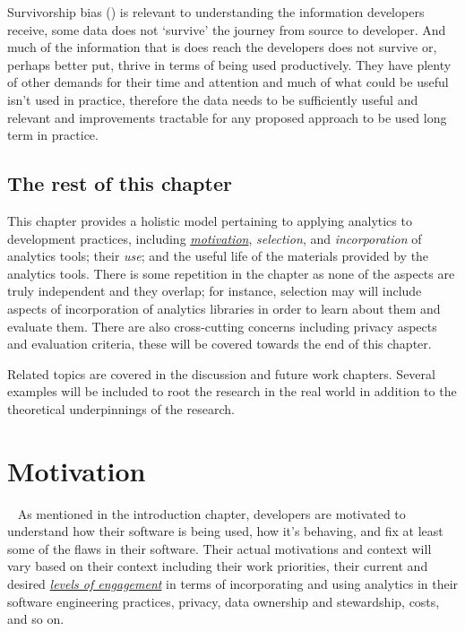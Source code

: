 Survivorship bias (\cite{wikipedia_survivorship_bias}) is relevant to understanding the information developers receive, some data does not `survive' the journey from source to developer. And much of the information that is does reach the developers does not survive or, perhaps better put, thrive in terms of being used productively. They have plenty of other demands for their time and attention and much of what could be useful isn't used in practice, therefore the data needs to be sufficiently useful and relevant and improvements tractable for any proposed approach to be used long term in practice.


\subsection{The rest of this chapter}
This chapter provides a holistic model pertaining to applying analytics to development practices, including \href{motivation-section}{\textit{motivation}}, \textit{selection}, and \textit{incorporation} of analytics tools; their \textit{use}; and the useful life of the materials provided by the analytics tools. There is some repetition in the chapter as none of the aspects are truly independent and they overlap; for instance, selection may will include aspects of incorporation of analytics libraries in order to learn about them and evaluate them. There are also cross-cutting concerns including privacy aspects and evaluation criteria, these will be covered towards the end of this chapter.

Related topics are covered in the discussion and future work chapters. Several examples will be included to root the research in the real world in addition to the theoretical underpinnings of the research.


\section{Motivation}~\label{motivation-section}
As mentioned in the introduction chapter, developers are motivated to understand how their software is being used, how it's behaving, and fix at least some of the flaws in their software. Their actual motivations and context will vary based on their context including their work priorities, their current and desired \href{subsection-levels-of-engagement}{\emph{levels of engagement}} in terms of incorporating and using analytics in their software engineering practices, privacy, data ownership and stewardship, costs, and so on.

